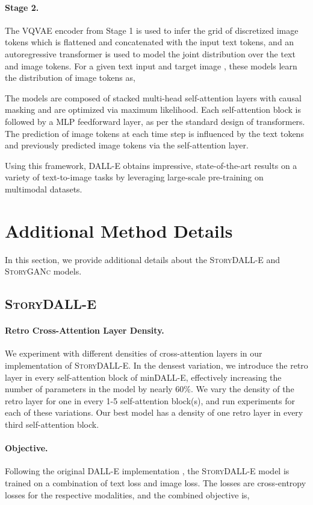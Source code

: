 \documentclass[runningheads]{llncs}
\newcommand{\sdalle}[1]{\textsc{StoryDALL-E}}
\newcommand{\sgan}[1]{\textsc{StoryGANc}}
\begin{document}
\paragraph{Stage 2.} The VQVAE encoder from Stage 1 is used to infer the grid of discretized image tokens which is flattened and concatenated with the input text tokens, and an autoregressive transformer is used to model the joint distribution over the text and image tokens. For a given text input  and target image , these models learn the distribution of image tokens  as,

The models are composed of stacked multi-head self-attention layers with causal masking and are optimized via maximum likelihood. Each self-attention block is followed by a MLP feedforward layer, as per the standard design of transformers. The prediction of image tokens at each time step is influenced by the text tokens and previously predicted image tokens via the self-attention layer.

Using this framework, DALL-E obtains impressive, state-of-the-art results on a variety of text-to-image tasks by leveraging large-scale pre-training on multimodal datasets.


\section{Additional Method Details} \label{sec:modeling_appendix}
In this section, we provide additional details about the \sdalle{} and \sgan{} models.

\subsection{\sdalle{}}

\paragraph{Retro Cross-Attention Layer Density.} We experiment with different densities of cross-attention layers in our implementation of \sdalle{}. In the densest variation, we introduce the retro layer in every self-attention block of minDALL-E, effectively increasing the number of parameters in the model by nearly 60\%. We vary the density of the retro layer for one in every 1-5 self-attention block(s), and run experiments for each of these variations. Our best model has a density of one retro layer in every third self-attention block.

\paragraph{Objective.} Following the original DALL-E implementation \cite{ramesh2021zero}, the \sdalle{} model is trained on a combination of text loss and image loss. The losses are cross-entropy losses for the respective modalities, and the combined objective is,
\end{document}
